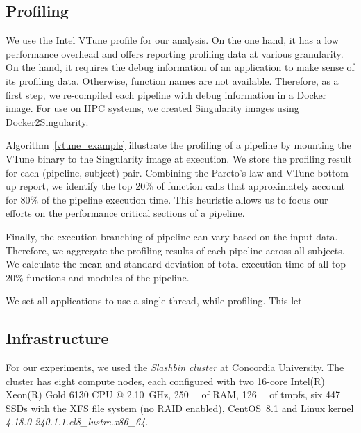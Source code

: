 \documentclass[conference]{IEEEtran}
\renewcommand{\lstlistingname}{Algorithm}
\begin{document}


\subsection{Profiling}
We use the Intel VTune profile for our analysis. On the one hand, it has a low performance overhead and offers reporting profiling data at various granularity. On the hand, it requires the debug information of an application to make sense of its profiling data. Otherwise, function names are not available. Therefore, as a first step, we re-compiled each pipeline with debug information in a Docker image. For use on HPC systems, we created Singularity images using Docker2Singularity.

\lstlistingname~\ref{vtune_example} illustrate the profiling of a pipeline by mounting the VTune binary to the Singularity image at execution. We store the profiling result for each (pipeline, subject) pair. Combining the Pareto's law and VTune bottom-up report, we identify the top 20\% of function calls that approximately account for 80\% of the pipeline execution time. This heuristic allows us to focus our efforts on the performance critical sections of a pipeline.



Finally, the execution branching of pipeline can vary based on the input data. Therefore, we aggregate the profiling results of each pipeline across all subjects. We calculate the mean and standard deviation of total execution time of all top 20\% functions and modules of the pipeline.

We set all applications to use a single thread, while profiling. This let 

\subsection{Infrastructure}
For our experiments, we used the \textit{Slashbin cluster} at Concordia University. The cluster has eight compute nodes, each configured with two 16-core Intel(R) Xeon(R) Gold 6130 CPU @ \SI{2.10}{\giga\hertz}, \SI{250}{\gibi\byte} of RAM, \SI{126}{\gibi\byte} of tmpfs, six \SI{447}{\gibi\byte} SSDs with the XFS file system (no RAID enabled), CentOS~8.1 and Linux kernel \textit{4.18.0-240.1.1.el8\_lustre.x86\_64}. 
\end{document}
